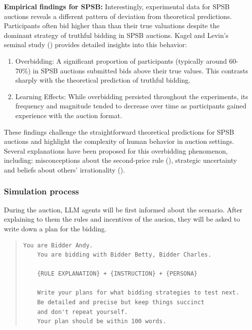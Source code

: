 \documentclass{article} %
\begin{document}
\textbf{Empirical findings for SPSB:}
Interestingly, experimental data for SPSB auctions reveals a different pattern of deviation from theoretical predictions. Participants often bid higher than than their true valuations despite the dominant strategy of truthful bidding in SPSB auctions.
Kagel and Levin's seminal study (\cite{kagel1987information,kagel1993independent}) provides detailed insights into this behavior:
\begin{enumerate}
    \item Overbidding: A significant proportion of participants (typically around 60-70\%) in SPSB auctions submitted bids above their true values. This contrasts sharply with the theoretical prediction of truthful bidding.
    \item Learning Effects: While overbidding persisted throughout the experiments, its frequency and magnitude tended to decrease over time as participants gained experience with the auction format.
\end{enumerate}

These findings challenge the straightforward theoretical predictions for SPSB auctions and highlight the complexity of human behavior in auction settings. Several explanations have been proposed for this overbidding phenomenon, including: misconceptions about the second-price rule (\cite{kagel1987information}), strategic uncertainty and beliefs about others' irrationality (\cite{crawford2007level}).




\subsubsection{Simulation process}

During the auction, LLM agents will be first informed about the scenario. After explaining to them the rules and incentives of the aucion, they will be asked to write down a plan for the bidding.
\begin{quote}
\begin{lstlisting}[basicstyle=\ttfamily]
    You are Bidder Andy.            
    You are bidding with Bidder Betty, Bidder Charles.     
    
    {RULE EXPLANATION} + {INSTRUCTION} + {PERSONA} 

    Write your plans for what bidding strategies to test next. 
    Be detailed and precise but keep things succinct 
    and don't repeat yourself. 
    Your plan should be within 100 words.
\end{lstlisting}
\end{quote}
\end{document}
